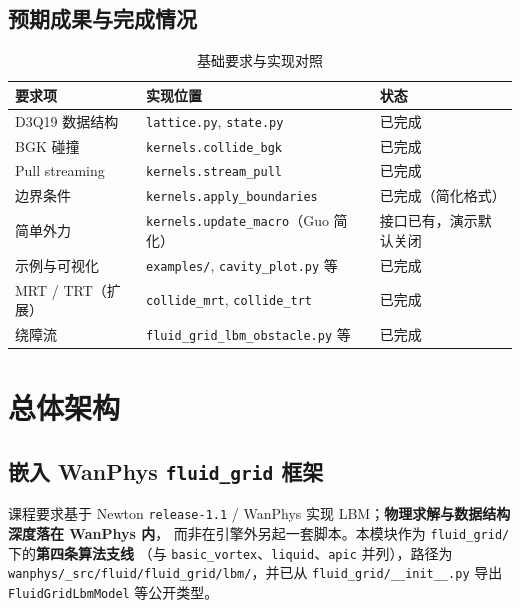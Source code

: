 \documentclass[UTF8,a4paper,11pt]{ctexart}
\begin{document}
\subsection{预期成果与完成情况}

\begin{table}[H]
  \centering
  \caption{基础要求与实现对照}
  \begin{tabular}{@{}lll@{}}
    \toprule
    要求项 & 实现位置 & 状态 \\
    \midrule
    D3Q19 数据结构 & \texttt{lattice.py}, \texttt{state.py} & 已完成 \\
    BGK 碰撞 & \texttt{kernels.collide\_bgk} & 已完成 \\
    Pull streaming & \texttt{kernels.stream\_pull} & 已完成 \\
    边界条件 & \texttt{kernels.apply\_boundaries} & 已完成（简化格式） \\
    简单外力 & \texttt{kernels.update\_macro}（Guo 简化） & 接口已有，演示默认关闭 \\
    示例与可视化 & \texttt{examples/}, \texttt{cavity\_plot.py} 等 & 已完成 \\
    MRT / TRT（扩展） & \texttt{collide\_mrt}, \texttt{collide\_trt} & 已完成 \\
    绕障流 & \texttt{fluid\_grid\_lbm\_obstacle.py} 等 & 已完成 \\
    \bottomrule
  \end{tabular}
\end{table}

\section{总体架构}

\subsection{嵌入 WanPhys \texttt{fluid\_grid} 框架}

课程要求基于 Newton \texttt{release-1.1} / WanPhys 实现 LBM；\textbf{物理求解与数据结构深度落在 WanPhys 内}，
而非在引擎外另起一套脚本。本模块作为 \texttt{fluid\_grid/} 下的\textbf{第四条算法支线}
（与 \texttt{basic\_vortex}、\texttt{liquid}、\texttt{apic} 并列），路径为
\texttt{wanphys/\_src/fluid/fluid\_grid/lbm/}，并已从 \texttt{fluid\_grid/\_\_init\_\_.py} 导出
\texttt{FluidGridLbmModel} 等公开类型。
\end{document}
